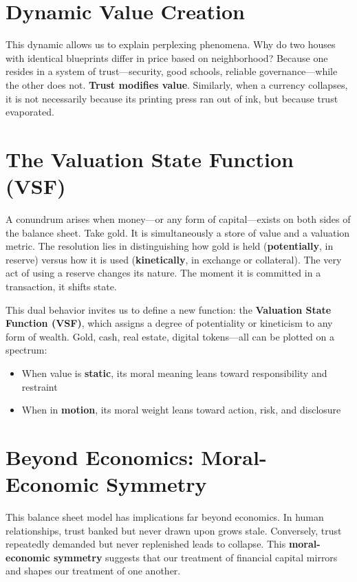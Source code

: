 \documentclass[11pt,oneside]{book}
\begin{document}
\section{Dynamic Value Creation}

This dynamic allows us to explain perplexing phenomena. Why do two houses with identical blueprints differ in price based on neighborhood? Because one resides in a system of trust—security, good schools, reliable governance—while the other does not. \textbf{Trust modifies value}. Similarly, when a currency collapses, it is not necessarily because its printing press ran out of ink, but because trust evaporated.

\section{The Valuation State Function (VSF)}

A conundrum arises when money—or any form of capital—exists on both sides of the balance sheet. Take gold. It is simultaneously a store of value and a valuation metric. The resolution lies in distinguishing how gold is held (\textbf{potentially}, in reserve) versus how it is used (\textbf{kinetically}, in exchange or collateral). The very act of using a reserve changes its nature. The moment it is committed in a transaction, it shifts state.

This dual behavior invites us to define a new function: the \textbf{Valuation State Function (VSF)}, which assigns a degree of potentiality or kineticism to any form of wealth. Gold, cash, real estate, digital tokens—all can be plotted on a spectrum:

\begin{itemize}
\item When value is \textbf{static}, its moral meaning leans toward responsibility and restraint
\item When in \textbf{motion}, its moral weight leans toward action, risk, and disclosure
\end{itemize}

\section{Beyond Economics: Moral-Economic Symmetry}

This balance sheet model has implications far beyond economics. In human relationships, trust banked but never drawn upon grows stale. Conversely, trust repeatedly demanded but never replenished leads to collapse. This \textbf{moral-economic symmetry} suggests that our treatment of financial capital mirrors and shapes our treatment of one another.
\end{document}
